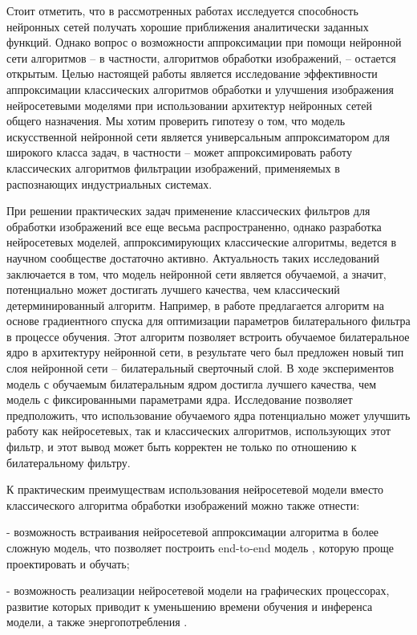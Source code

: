 Стоит отметить, что в рассмотренных работах исследуется способность нейронных сетей получать хорошие приближения аналитически заданных функций. Однако вопрос о возможности аппроксимации при помощи нейронной сети алгоритмов – в частности, алгоритмов обработки изображений, – остается открытым. Целью настоящей работы является исследование эффективности аппроксимации классических алгоритмов обработки и улучшения изображения нейросетевыми моделями при использовании архитектур нейронных сетей общего назначения. Мы хотим проверить гипотезу о том, что модель искусственной нейронной сети является универсальным аппроксиматором для широкого класса задач, в частности – может аппроксимировать работу классических алгоритмов фильтрации изображений, применяемых в распознающих индустриальных системах. 

При решении практических задач применение классических фильтров для обработки изображений все еще весьма распространенно, однако разработка нейросетевых моделей, аппроксимирующих классические алгоритмы, ведется в научном сообществе достаточно активно. Актуальность таких исследований заключается в том, что модель нейронной сети является обучаемой, а значит, потенциально может достигать лучшего качества, чем классический детерминированный алгоритм. Например, в работе \cite{Jampani2016LearningSH} предлагается алгоритм на основе градиентного спуска для оптимизации параметров билатерального фильтра в процессе обучения. Этот алгоритм позволяет встроить обучаемое билатеральное ядро в архитектуру нейронной сети, в результате чего был предложен новый тип слоя нейронной сети – билатеральный сверточный слой. В ходе экспериментов модель с обучаемым билатеральным ядром достигла лучшего качества, чем модель с фиксированными параметрами ядра. Исследование позволяет предположить, что использование обучаемого ядра потенциально может улучшить работу как нейросетевых, так и классических алгоритмов, использующих этот фильтр, и этот вывод может быть корректен не только по отношению к билатеральному фильтру.

К практическим преимуществам использования нейросетевой модели вместо классического алгоритма обработки изображений можно также отнести:

- возможность встраивания нейросетевой аппроксимации алгоритма в более сложную модель, что позволяет построить end-to-end модель \cite{Yi2016LearnedIFT}, которую проще проектировать и обучать;

- возможность реализации нейросетевой модели на графических процессорах, развитие которых приводит к уменьшению времени обучения и инференса модели, а также энергопотребления \cite{Febbo2018KCNN}.

